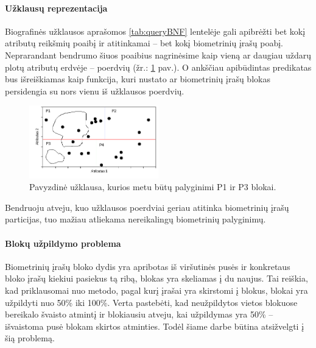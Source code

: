 \paragraph{Užklausų reprezentacija}

Biografinės užklausos aprašomos \ref{tab:queryBNF} lentelėje gali apibrėžti bet kokį atributų reikšmių poaibį ir atitinkamai -- bet kokį biometrinių įrašų poabį.
Neprarandant bendrumo šiuos poaibius nagrinėsime kaip vieną ar daugiau uždarų plotų atributų erdvėje -- poerdvių (žr.: \ref{img:multidimensionalPartitionedGalleryWithQuery} pav.). %
O ankščiau apibūdintas predikatas bus išreiškiamas kaip funkcija, kuri nustato ar biometrinių įrašų blokas persidengia su nors vienu iš užklausos poerdvių.

\begin{figure}[H]
\begin{center}
\includegraphics[width=0.5\textwidth]{img/MultidimensionalPartitionedGalleryWithQuery.png}
\caption{Pavyzdinė užklausa, kurios metu būtų palyginimi P1 ir P3 blokai.}
\label{img:multidimensionalPartitionedGalleryWithQuery}
\end{center}
\end{figure}

Bendruoju atveju, kuo užklausos poerdviai geriau atitinka biometrinių įrašų particijas, tuo mažiau atliekama nereikalingų biometrinių palyginimų.

\paragraph{Blokų užpildymo problema}

Biometrinių įrašų bloko dydis yra apribotas iš viršutinės pusės ir konkretaus bloko įrašų kiekiui pasiekus tą ribą, blokas yra skeliamas į du naujus.
Tai reiškia, kad priklausomai nuo metodo, pagal kurį įrašai yra skirstomi į blokus, blokai yra užpildyti nuo 50\% iki 100\%.
Verta pastebėti, kad neužpildytos vietos blokuose bereikalo švaisto atmintį ir blokiausiu atveju, kai užpildymas yra 50\% -- išvaistoma pusė blokam skirtos atminties.
Todėl šiame darbe būtina atsižvelgti į šią problemą.

